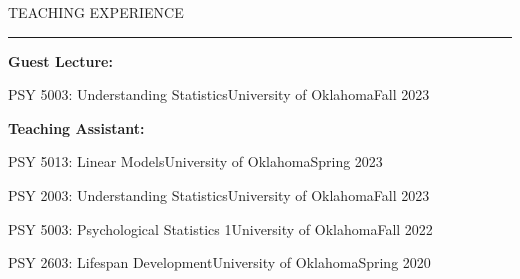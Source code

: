 \documentclass{resume} %
\renewenvironment{rSection}[1]{
	\sectionskip
	\textcolor{CarnegieMellonRed}{\MakeUppercase{#1}}
	\sectionlineskip
	\hrule
	\begin{list}{}{
			\setlength{\leftmargin}{1.5em}
		}
		\item[]
	}{
	\end{list}
}
\begin{document}
	\begin{rSection}{Teaching Experience}
		\bf{Guest Lecture:}\\
		\begin{rSubsectionTeach}{PSY 5003: Understanding Statistics}{University of Oklahoma}{Fall 2023}
		\end{rSubsectionTeach}
		
		\bf{Teaching Assistant:}\\
		\begin{rSubsectionTeach}{PSY 5013: Linear Models}{University of Oklahoma}{Spring 2023}
		\end{rSubsectionTeach}
		\begin{rSubsectionTeach}{PSY 2003: Understanding Statistics}{University of Oklahoma}{Fall 2023}
		\end{rSubsectionTeach}
		\begin{rSubsectionTeach}{PSY 5003: Psychological Statistics 1}{University of Oklahoma}{Fall 2022}
		\end{rSubsectionTeach}
		\begin{rSubsectionTeach}{PSY 2603: Lifespan Development}{University of Oklahoma}{Spring 2020}
		\end{rSubsectionTeach}
		
	\end{rSection}
	
\end{document}
